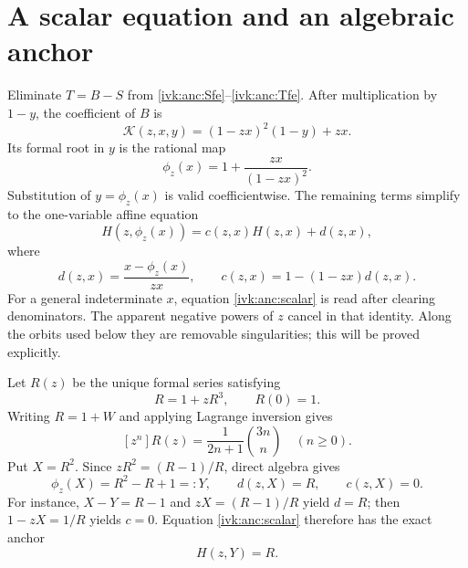 \documentclass[11pt,letterpaper]{article}
\theoremstyle{remark}\newtheorem{remark}[theorem]{Remark}
\newcommand{\ph}{\phi_z}
\begin{document}
\section{A scalar equation and an algebraic anchor}\label{ivk:anc:sec:anchor}
Eliminate $T=B-S$ from \eqref{ivk:anc:Sfe}--\eqref{ivk:anc:Tfe}. After multiplication
by $1-y$, the coefficient of $B$ is
\[
 \mathcal K(z,x,y)=(1-zx)^2(1-y)+zx.
\]
Its formal root in $y$ is the rational map
\begin{equation}\label{ivk:anc:phi}
 \ph(x)=1+\frac{zx}{(1-zx)^2}.
\end{equation}
Substitution of $y=\ph(x)$ is valid coefficientwise. The remaining
terms simplify to the one-variable affine equation
\begin{equation}\label{ivk:anc:scalar}
 H(z,\ph(x))=c(z,x)H(z,x)+d(z,x),
\end{equation}
where
\begin{equation}\label{ivk:anc:cd}
 d(z,x)=\frac{x-\ph(x)}{zx},\qquad
 c(z,x)=1-(1-zx)d(z,x).
\end{equation}
For a general indeterminate $x$, equation \eqref{ivk:anc:scalar} is read
after clearing denominators. The apparent negative powers of $z$
cancel in that identity. Along the orbits used below they are
removable singularities; this will be proved explicitly.

Let $R(z)$ be the unique formal series satisfying
\begin{equation}\label{ivk:anc:ternary}
 R=1+zR^3,\qquad R(0)=1.
\end{equation}
Writing $R=1+W$ and applying Lagrange inversion gives
\begin{equation}\label{ivk:anc:Rcoeff}
 [z^n]R(z)=\frac1{2n+1}\binom{3n}{n}\quad(n\ge0).
\end{equation}
Put $X=R^2$. Since $zR^2=(R-1)/R$, direct algebra gives
\begin{equation}\label{ivk:anc:anchoridentities}
 \ph(X)=R^2-R+1=:Y,\qquad d(z,X)=R,\qquad c(z,X)=0.
\end{equation}
For instance, $X-Y=R-1$ and $zX=(R-1)/R$ yield $d=R$;
then $1-zX=1/R$ yields $c=0$. Equation \eqref{ivk:anc:scalar} therefore
has the exact anchor
\begin{equation}\label{ivk:anc:anchor}
 H(z,Y)=R.
\end{equation}
\end{document}
